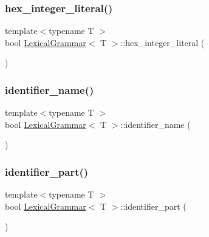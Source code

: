 \mbox{\label{class_lexical_grammar_aca046d0a2eacbece1c05fb59548efdbd}} 
\subsubsection{\texorpdfstring{hex\+\_\+integer\+\_\+literal()}{hex\_integer\_literal()}}
{\footnotesize\ttfamily template$<$typename T $>$ \\
bool \hyperlink{class_lexical_grammar}{Lexical\+Grammar}$<$ T $>$\+::hex\+\_\+integer\+\_\+literal (\begin{DoxyParamCaption}{ }\end{DoxyParamCaption})\hspace{0.3cm}{\ttfamily [inline]}}

\mbox{\label{class_lexical_grammar_a851951b0798abd9c6fdf0ae3e49d299b}} 
\subsubsection{\texorpdfstring{identifier\+\_\+name()}{identifier\_name()}}
{\footnotesize\ttfamily template$<$typename T $>$ \\
bool \hyperlink{class_lexical_grammar}{Lexical\+Grammar}$<$ T $>$\+::identifier\+\_\+name (\begin{DoxyParamCaption}{ }\end{DoxyParamCaption})\hspace{0.3cm}{\ttfamily [inline]}}

\mbox{\label{class_lexical_grammar_a744e87b07d654b2769e5f0855b30c870}} 
\subsubsection{\texorpdfstring{identifier\+\_\+part()}{identifier\_part()}}
{\footnotesize\ttfamily template$<$typename T $>$ \\
bool \hyperlink{class_lexical_grammar}{Lexical\+Grammar}$<$ T $>$\+::identifier\+\_\+part (\begin{DoxyParamCaption}{ }\end{DoxyParamCaption})\hspace{0.3cm}{\ttfamily [inline]}}

